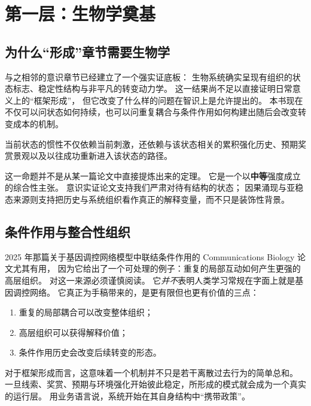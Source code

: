 \section{第一层：生物学奠基}

\subsection{为什么“形成”章节需要生物学}

与之相邻的意识章节已经建立了一个强实证底板：
生物系统确实呈现有组织的状态标志、稳定性结构与非平凡的转变动力学。
这一结果尚不足以直接证明日常意义上的“框架形成”，
但它改变了什么样的问题在智识上是允许提出的。
本书现在不仅可以问状态如何持续，也可以问重复耦合与条件作用如何构建出随后会改变转变成本的机制。

\begin{proposition}[对历史敏感的惯性]
当前状态的惯性不仅依赖当前刺激，还依赖与该状态相关的累积强化历史、预期奖赏景观以及以往成功重新进入该状态的路径。
\end{proposition}

\begin{discussion}
这一命题并不是从某一篇论文中直接提炼出来的定理。
它是一个以\textbf{中等}强度成立的综合性主张。
意识实证论文支持我们严肃对待有结构的状态；
因果涌现与亚稳态来源则支持把历史与系统组织看作真正的解释变量，而不只是装饰性背景。
\end{discussion}

\subsection{条件作用与整合性组织}

2025 年那篇关于基因调控网络模型中联结条件作用的 Communications Biology 论文尤其有用，
因为它给出了一个可处理的例子：重复的局部互动如何产生更强的高层组织。
对这一来源必须谨慎阅读。
它\emph{并不}表明人类学习常规在字面上就是基因调控网络。
它真正为手稿带来的，是更有限但也更有价值的三点：
\begin{enumerate}[nosep]
  \item 重复的局部耦合可以改变整体组织；
  \item 高层组织可以获得解释价值；
  \item 条件作用历史会改变后续转变的形态。
\end{enumerate}

对于框架形成而言，这意味着一个机制并不只是若干离散过去行为的简单总和。
一旦线索、奖赏、预期与环境强化开始彼此稳定，所形成的模式就会成为一个真实的运行层。
用业务语言说，系统开始在其自身结构中“携带政策”。

